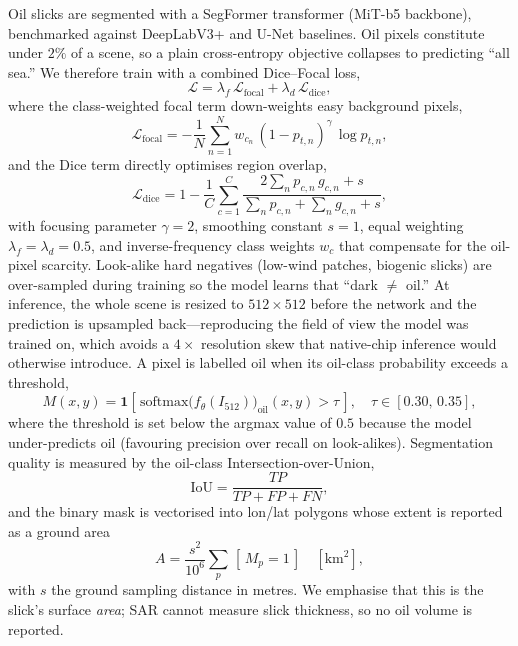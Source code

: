 \documentclass[a4paper,11pt]{article}
\begin{document}
Oil slicks are segmented with a SegFormer transformer (MiT-b5 backbone), benchmarked
against DeepLabV3+ and U-Net baselines. Oil pixels constitute under $2\%$ of a scene, so
a plain cross-entropy objective collapses to predicting ``all sea.'' We therefore train
with a combined Dice--Focal loss,
\begin{equation}
\mathcal{L} = \lambda_f\,\mathcal{L}_{\text{focal}} + \lambda_d\,\mathcal{L}_{\text{dice}},
\end{equation}
where the class-weighted focal term down-weights easy background pixels,
\begin{equation}
\mathcal{L}_{\text{focal}} = -\frac{1}{N}\sum_{n=1}^{N} w_{c_n}\,(1 - p_{t,n})^{\gamma}\,\log p_{t,n},
\end{equation}
and the Dice term directly optimises region overlap,
\begin{equation}
\mathcal{L}_{\text{dice}} = 1 - \frac{1}{C}\sum_{c=1}^{C}
\frac{2\sum_n p_{c,n}\,g_{c,n} + s}{\sum_n p_{c,n} + \sum_n g_{c,n} + s},
\end{equation}
with focusing parameter $\gamma=2$, smoothing constant $s=1$, equal weighting
$\lambda_f=\lambda_d=0.5$, and inverse-frequency class weights $w_c$ that compensate for
the oil-pixel scarcity. Look-alike hard negatives (low-wind patches, biogenic slicks)
are over-sampled during training so the model learns that ``dark $\neq$ oil.'' At
inference, the whole scene is resized to $512\times512$ before the network and the
prediction is upsampled back---reproducing the field of view the model was trained on,
which avoids a $4\times$ resolution skew that native-chip inference would otherwise
introduce. A pixel is labelled oil when its oil-class probability exceeds a threshold,
\begin{equation}
M(x,y) = \mathbf{1}\!\left[\,\mathrm{softmax}\big(f_\theta(I_{512})\big)_{\text{oil}}(x,y) > \tau\,\right],
\quad \tau \in [0.30,\,0.35],
\end{equation}
where the threshold is set below the argmax value of $0.5$ because the model
under-predicts oil (favouring precision over recall on look-alikes). Segmentation
quality is measured by the oil-class Intersection-over-Union,
\begin{equation}
\text{IoU} = \frac{TP}{TP + FP + FN},
\end{equation}
and the binary mask is vectorised into lon/lat polygons whose extent is reported as a
ground area
\begin{equation}
A = \frac{s^2}{10^6}\sum_{p}\,[\,M_p = 1\,] \quad [\text{km}^2],
\end{equation}
with $s$ the ground sampling distance in metres. We emphasise that this is the slick's
surface \emph{area}; SAR cannot measure slick thickness, so no oil volume is reported.
\end{document}
